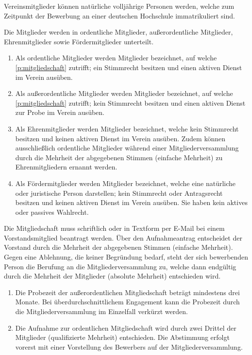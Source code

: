 \documentclass[%
    parskip=half,
]{scrartcl}
\begin{document}
	\begin{contract}
	
				
		Vereinsmitglieder können natürliche volljährige Personen werden, welche zum Zeitpunkt der Bewerbung an einer deutschen Hochschule immatrikuliert sind.
		\label{p:mitgliedschaft}
		
		Die Mitglieder werden in ordentliche Mitglieder, außerordentliche Mitglieder, Ehrenmitglieder sowie Fördermitglieder unterteilt.
		
		\begin{enumerate}[\qquad a)]
			\item Als ordentliche Mitglieder werden Mitglieder bezeichnet, auf welche \ref{p:mitgliedschaft} zutrifft; ein Stimmrecht besitzen und einen aktiven Dienst im Verein ausüben.
			\item Als außerordentliche Mitglieder werden Mitglieder bezeichnet, auf welche \ref{p:mitgliedschaft} zutrifft; kein Stimmrecht besitzen und einen aktiven Dienst zur Probe im Verein ausüben.
			\item Als Ehrenmitglieder werden Mitglieder bezeichnet, welche kein Stimmrecht besitzen und keinen aktiven Dienst im Verein ausüben. Zudem können ausschließlich ordentliche Mitglieder während einer Mitgliederversammlung durch die Mehrheit der abgegebenen Stimmen (einfache Mehrheit) zu Ehrenmitgliedern ernannt werden.
			\item Als Fördermitglieder werden Mitglieder bezeichnet, welche eine natürliche oder juristische Person darstellen; kein Stimmrecht oder Antragsrecht besitzen und keinen aktiven Dienst im Verein ausüben. Sie haben kein aktives oder passives Wahlrecht.
		\end{enumerate}
		
		Die Mitgliedschaft muss schriftlich oder in Textform per E-Mail bei einem Vorstandsmitglied beantragt werden. Über den Aufnahmeantrag entscheidet der Vorstand durch die Mehrheit der abgegebenen Stimmen (einfache Mehrheit). Gegen eine Ablehnung, die keiner Begründung bedarf, steht der sich bewerbenden Person die Berufung an die Mitgliederversammlung zu, welche dann endgültig durch die Mehrheit der Mitglieder (absolute Mehrheit) entschieden wird.
		
		\begin{enumerate}[\qquad a)]
			\item Die Probezeit der außerordentlichen Mitgliedschaft beträgt mindestens drei Monate. Bei überdurchschnittlichem Engagement kann die Probezeit durch die Mitgliederversammlung im Einzelfall verkürzt werden.
			\item Die Aufnahme zur ordentlichen Mitgliedschaft wird durch zwei Drittel der Mitglieder (qualifizierte Mehrheit) entschieden. Die Abstimmung erfolgt vorerst mit einer Vorstellung des Bewerbers auf der Mitgliederversammlung.
		\end{enumerate}
		

\end{contract}
\end{document}
